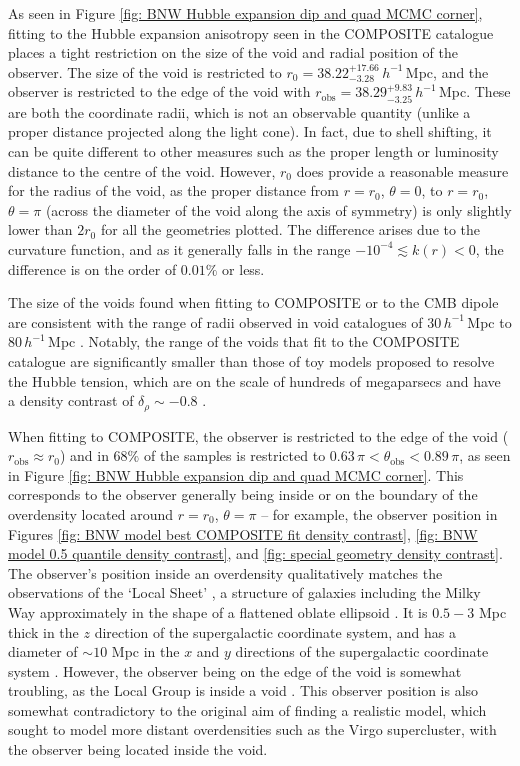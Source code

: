 \documentclass[a4paper,12pt]{report}
\begin{document}
As seen in Figure \ref{fig: BNW Hubble expansion dip and quad MCMC corner}, fitting to the Hubble expansion anisotropy seen in the COMPOSITE catalogue places a tight restriction on the size of the void and radial position of the observer. The size of the void is restricted to $r_0 = 38.22^{+17.66}_{-3.28}\, h^{-1}\,$Mpc, and the observer is restricted to the edge of the void with $r_\text{obs} = 38.29^{+9.83}_{-3.25}\, h^{-1}\,$Mpc. These are both the coordinate radii, which is not an observable quantity (unlike a proper distance projected along the light cone). In fact, due to shell shifting, it can be quite different to other measures such as the proper length or luminosity distance to the centre of the void. However, $r_0$ does provide a reasonable measure for the radius of the void, as the proper distance from $r=r_0$, $\theta=0$, to $r=r_0$, $\theta=\pi$ (across the diameter of the void along the axis of symmetry) is only slightly lower than $2r_0$ for all the geometries plotted. The difference arises due to the curvature function, and as it generally falls in the range $-10^{-4} \lesssim k(r) < 0$, the difference is on the order of $0.01\%$ or less.

The size of the voids found when fitting to COMPOSITE or to the CMB dipole are consistent with the range of radii observed in void catalogues of $30\, h^{-1}\,$Mpc to $80\, h^{-1}\,$Mpc \cite{RN197}.
Notably, the range of the voids that fit to the COMPOSITE catalogue are significantly smaller than those of toy models proposed to resolve the Hubble tension, which are on the scale of hundreds of megaparsecs and have a density contrast of $\delta_\rho \sim -0.8$ \cite{RN198,RN124}.

When fitting to COMPOSITE, the observer is restricted to the edge of the void ($r_\text{obs} \approx r_0$) and in $68\%$ of the samples is restricted to $0.63\,\pi < \theta_ \text{obs} < 0.89\,\pi$, as seen in Figure \ref{fig: BNW Hubble expansion dip and quad MCMC corner}. This corresponds to the observer generally being inside or on the boundary of the overdensity located around $r=r_0$, $\theta=\pi$ -- for example, the observer position in Figures \ref{fig: BNW model best COMPOSITE fit density contrast}, \ref{fig: BNW model 0.5 quantile density contrast}, and \ref{fig: special geometry density contrast}. The observer's position inside an overdensity qualitatively matches the observations of the `Local Sheet' \cite{RN74,RN240,RN241}, a structure of galaxies including the Milky Way approximately in the shape of a flattened oblate ellipsoid \cite{RN241}. It is $0.5 - 3$ Mpc thick in the $z$ direction of the supergalactic coordinate system, and has a diameter of $\sim 10$ Mpc in the $x$ and $y$ directions of the supergalactic coordinate system \cite{RN74,RN240}. However, the observer being on the edge of the void is somewhat troubling, as the Local Group is inside a void \cite{RN74}. This observer position is also somewhat contradictory to the original aim of finding a realistic model, which sought to model more distant overdensities such as the Virgo supercluster, with the observer being located inside the void.
\end{document}

